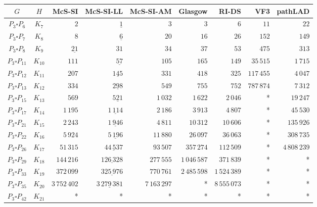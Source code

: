 
\begin{tabular}{ccrrrrrrr}
    \toprule
    {$G$} & {$H$} & {McS-SI} & {McS-SI-LL} & {McS-SI-AM} & Glasgow & RI-DS & VF3 & pathLAD \\ 
    \midrule

$P_3\square P_{6}$ & $K_{7}$ & $2$ & $\underline{1}$ & $3$ & $3$ & $6$ & $11$ & $22$\\
$P_3\square P_{7}$ & $K_{8}$ & $8$ & $\underline{6}$ & $20$ & $16$ & $26$ & $152$ & $149$\\
$P_3\square P_{8}$ & $K_{9}$ & $\underline{21}$ & $31$ & $34$ & $37$ & $53$ & $475$ & $313$\\
$P_3\square P_{11}$ & $K_{10}$ & $111$ & $\underline{57}$ & $105$ & $165$ & $149$ & $35\,515$ & $1\,715$\\
$P_3\square P_{12}$ & $K_{11}$ & $207$ & $\underline{145}$ & $331$ & $418$ & $325$ & $117\,455$ & $4\,047$\\
$P_3\square P_{13}$ & $K_{12}$ & $334$ & $\underline{298}$ & $549$ & $755$ & $752$ & $787\,874$ & $7\,312$\\
$P_3\square P_{15}$ & $K_{13}$ & $569$ & $\underline{521}$ & $1\,032$ & $1\,622$ & $2\,046$ & * & $19\,247$\\
$P_3\square P_{17}$ & $K_{14}$ & $1\,195$ & $\underline{1\,114}$ & $2\,186$ & $3\,913$ & $4\,807$ & * & $45\,530$\\
$P_3\square P_{21}$ & $K_{15}$ & $2\,243$ & $\underline{1\,946}$ & $4\,811$ & $10\,312$ & $10\,606$ & * & $135\,926$\\
$P_3\square P_{22}$ & $K_{16}$ & $5\,924$ & $\underline{5\,196}$ & $11\,880$ & $26\,097$ & $36\,063$ & * & $308\,735$\\
$P_3\square P_{26}$ & $K_{17}$ & $51\,315$ & $\underline{44\,537}$ & $93\,507$ & $357\,274$ & $112\,509$ & * & $4\,808\,239$\\
$P_3\square P_{29}$ & $K_{18}$ & $144\,216$ & $\underline{126\,328}$ & $277\,555$ & $1\,046\,587$ & $371\,839$ & * & *\\
$P_3\square P_{33}$ & $K_{19}$ & $372\,099$ & $\underline{325\,976}$ & $770\,761$ & $2\,485\,598$ & $1\,524\,389$ & * & *\\
$P_3\square P_{35}$ & $K_{20}$ & $3\,752\,402$ & $\underline{3\,279\,381}$ & $7\,163\,297$ & * & $8\,555\,073$ & * & *\\
$P_3\square P_{42}$ & $K_{21}$ & * & * & * & * & * & * & *\\

    \bottomrule
\end{tabular}

